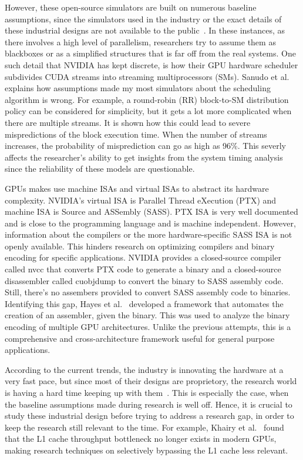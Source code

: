 However, these open-source simulators are built on numerous baseline assumptions, since the simulators used in the industry or the exact details of these industrial designs are not available to the public~\cite{Khairy2020}.
In these instances, as there involves a high level of parallelism, researchers try to assume them as blackboxes or as a simplified structures that is far off from the real systems.
One such detail that NVIDIA has kept discrete, is how their GPU hardware scheduler subdivides CUDA streams into streaming multiprocessors (SMs). 
Sanudo et al.~\cite{Sanudo2020} explains how assumptions made my most simulators about the scheduling algorithm is wrong.
For example, a round-robin (RR) block-to-SM distribution policy can be considered for simplicity, but it gets a lot more complicated when there are multiple streams.
It is shown how this could lead to severe mispredictions of the block execution time.
When the number of streams increases, the probability of misprediction can go as high as 96\%.
This severly affects the researcher's ability to get insights from the system timing analysis since the reliability of these models are questionable.

GPUs makes use machine ISAs and virtual ISAs to abstract its hardware complexity.
NVIDIA's virtual ISA is Parallel Thread eXecution (PTX) and machine ISA is Source and ASSembly (SASS).
PTX ISA is very well documented and is close to the programming language and is machine independent.
However, information about the compilers or the more hardware-specific SASS ISA is not openly available.
This hinders research on optimizing compilers and binary encoding for specific applications.
NVIDIA provides a closed-source compiler called nvcc that converts PTX code to generate a binary and a closed-source disassembler called cuobjdump to convert the binary to SASS assembly code.
Still, there's no assembers provided to convert SASS assembly code to binaries.
Identifying this gap, Hayes et al.~\cite{Hayes2019} developed a framework that automates the creation of an assembler, given the binary.
This was used to analyze the binary encoding of multiple GPU architectures.
Unlike the previous attempts, this is a comprehensive and cross-architecture framework useful for general purpose applications.

According to the current trends, the industry is innovating the hardware at a very fast pace, but since most of their designs are proprietory, the research world is having a hard time keeping up with them~\cite{Khairy2020}.
This is especially the case, when the baseline assumptions made during research is well off.
Hence, it is crucial to study these industrial design before trying to address a research gap, in order to keep the research still relevant to the time.
For example, Khairy et al.~\cite{Khairy2020} found that the L1 cache throughput bottleneck no longer exists in modern GPUs, making research techniques on selectively bypassing the L1 cache less relevant.

